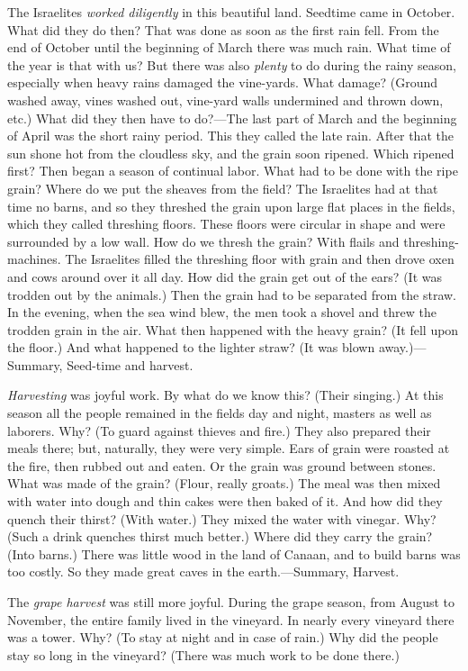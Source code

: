 The Israelites \emph{worked diligently} in this beautiful land. Seedtime came in October. What did they do then? That was done as soon as the first rain fell. From the end of October until the beginning of March there was much rain. What time of the year is that with us? But there was also \emph{plenty} to do during the rainy
season, especially when heavy rains damaged the vine-yards. What damage? (Ground washed away, vines washed out, vine-yard walls undermined and thrown down, etc.) What did they then have to do?—The last part of March and the beginning of April was the short rainy period. This they called the late rain. After that the sun shone hot from the cloudless sky, and the grain soon ripened. Which ripened first? Then began a season of continual labor. What had to be done with the ripe grain? Where do we put the sheaves from the field? The Israelites had at that time no barns, and so they threshed the grain upon large flat places in the fields, which they called threshing floors. These floors were circular in shape and were surrounded by a low wall. How do we thresh the grain? With flails and threshing-machines. The Israelites filled the threshing floor with grain and then drove oxen and cows around over it all day. How did the grain get out of the ears? (It was trodden out by the animals.) Then the grain had to be separated from the straw. In the evening, when the sea wind blew, the men took a shovel and threw the trodden grain in the air. What then happened with the heavy grain? (It fell upon the floor.) And what happened to the lighter straw? (It was blown away.)—Summary, Seed-time and harvest.

\emph{Harvesting} was joyful work. By what do we know this? (Their singing.) At this season all the people remained in the fields day and night, masters as well as laborers. Why? (To guard against thieves and fire.) They also prepared their meals there; but, naturally, they were very simple. Ears of grain were roasted at the fire, then rubbed out and eaten. Or the grain was ground between stones. What was made of the grain? (Flour, really groats.) The meal was then mixed with water into dough and thin cakes were then baked of it. And how did they quench their thirst? (With water.) They mixed the water with vinegar. Why? (Such a drink quenches thirst much better.) Where did they carry the grain? (Into barns.) There was little wood in the land of Canaan, and to build barns was too costly. So they made great caves in the earth.—Summary, Harvest.

The \emph{grape harvest} was still more joyful. During the grape season, from August to November, the entire family lived in the vineyard. In nearly every vineyard there was a tower. Why? (To stay at night and in case of rain.) Why did the people stay so long in the vineyard? (There was much work to be done there.)


